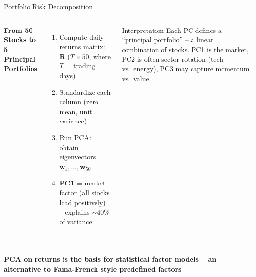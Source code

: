 \documentclass[8pt,aspectratio=169]{beamer}
\newcommand{\bottomnote}[1]{%
\vfill
\vspace{-2mm}
\textcolor{mllavender2}{\rule{\textwidth}{0.4pt}}
\vspace{1mm}
\footnotesize
\textbf{#1}
}
\newcommand{\highlight}[1]{\textcolor{mlorange}{\textbf{#1}}}
\begin{document}
\begin{frame}[t]{Portfolio Risk Decomposition}
\begin{columns}[T]
\small
\textbf{From 50 Stocks to 5 Principal Portfolios}

\vspace{2mm}
\begin{enumerate}
\setlength{\itemsep}{4pt}
\item Compute daily returns matrix: $\mathbf{R}$ ($T \times 50$, where $T$ = trading days)
\item Standardize each column (zero mean, unit variance)
\item Run PCA: obtain eigenvectors $\mathbf{w}_1, \ldots, \mathbf{w}_{50}$
\item \highlight{PC1} = market factor (all stocks load positively) -- explains $\sim$40\% of variance
\end{enumerate}

\vspace{2mm}
\begin{block}{Interpretation}
\scriptsize Each PC defines a ``principal portfolio'' -- a linear combination of stocks. PC1 is the market, PC2 is often sector rotation (tech vs.\ energy), PC3 may capture momentum vs.\ value.
\end{block}
\end{columns}

\bottomnote{PCA on returns is the basis for statistical factor models -- an alternative to Fama-French style predefined factors}
\end{frame}
\end{document}
